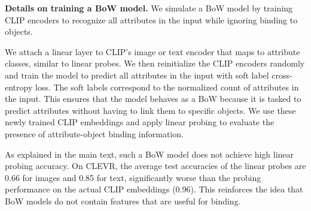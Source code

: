 \noindent
\textbf{Details on training a BoW model.}
We simulate a BoW model by training CLIP encoders to recognize all attributes in the input while ignoring binding to objects. 

We attach a linear layer to CLIP’s image or text encoder that maps to attribute classes, similar to linear probes. We then reinitialize the CLIP encoders randomly and train the model to predict all attributes in the input with soft label cross-entropy loss. The soft labels correspond to the normalized count of attributes in the input. This ensures that the model behaves as a BoW because it is tasked to predict attributes without having to link them to specific objects.
We use these newly trained CLIP embeddings and apply linear probing to evaluate the presence of attribute-object binding information.

As explained in the main text, such a BoW model does not achieve high linear probing accuracy. On CLEVR, the average test accuracies of the linear probes are {0.66} for images and {0.85} for text, significantly worse than the probing performance on the actual CLIP embeddings (0.96). This reinforces the idea that BoW models do not contain features that are useful for binding.




